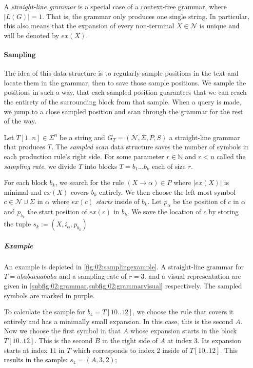 \documentclass{scrartcl}
\begin{document}
A \emph{straight-line grammar} is a special case of a context-free grammar, where $|L(G)| = 1$.
That is, the grammar only produces one single string. In particular, this also means that the expansion of every non-terminal $X \in \mathcal{N}$ is unique and will be denoted by $ex(X)$.

\paragraph{Sampling} The idea of this data structure is to regularly sample positions in the text and locate them in the grammar, then to save those sample positions.
We sample the positions in such a way, that each sampled position guarantees that we can reach the entirety of the surrounding block from that sample.
When a query is made, we jump to a close sampled position and scan through the grammar for the rest of the way.

Let $T[1..n] \in \Sigma^n$ be a string and $G_T = (\mathcal{N}, \Sigma, P, S)$ a straight-line grammar that produces $T$.
The \emph{sampled scan} data structure saves the number of symbols in each production rule's right side.
For some parameter $r \in \mathbb{N}$ and $r < n$ called the \emph{sampling rate}, we divide $T$ into blocks $T = b_1 \dots b_k$ each of size $r$.

For each block $b_k$, we search for the rule $(X \rightarrow \alpha) \in P$ where $|ex(X)|$ is minimal and $ex(X)$ covers $b_k$ entirely.
We then choose the left-most symbol $c \in \mathcal{N} \cup \Sigma$ in $\alpha$ where $ex(c)$ \emph{starts} inside of $b_k$.
Let $p_\alpha$ be the position of $c$ in $\alpha$ and $p_{b_k}$ the start position of $ex(c)$ in $b_k$. We save the location of $c$ by storing the tuple $s_k := (X, i_\alpha, p_{b_k})$

\subparagraph{Example}

An example is depicted in \cref{fig:02:samplingexample}.
A straight-line grammar for $T = ababacaababa$ and a sampling rate of $r=3$.
and a visual representation are given in \cref{subfig:02:grammar,subfig:02:grammarvisual} respectively.
The sampled symbols are marked in purple.

To calculate the sample for $b_4 = T[10..12]$, we choose the rule that covers it entirely and has a minimally small expansion.
In this case, this is the second $A$. Now we choose the first symbol in that $A$ whose expansion starts in the block $T[10..12]$.
This is the second $B$ in the right side of $A$  at index $3$. Its expansion starts at index $11$ in $T$ which corresponds to index $2$ inside of $T[10..12]$.
This results in the sample: $s_4 = (A, 3, 2)$;
\end{document}

